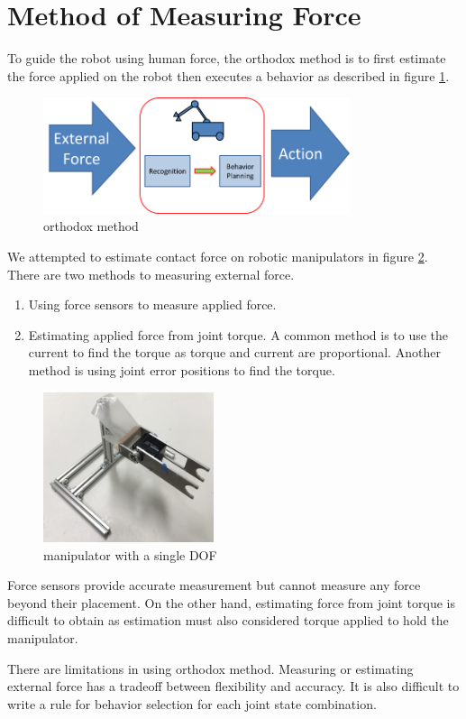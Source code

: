 \section{Method of Measuring Force}
To guide the robot using human force, the orthodox method is to first estimate the force applied on the robot then executes a behavior as described in figure \ref{fig:orthodox}.

\begin{figure}[!h]
\begin{center}
\includegraphics[width=9cm]{orthodox_method.png}
\caption{orthodox method}
\label{fig:orthodox}
\end{center}
\end{figure}

We attempted to estimate contact force on robotic manipulators in figure \ref{fig:manipulator}. There are two methods to measuring external force. 

\begin{enumerate}
\item Using force sensors to measure applied force.
\item Estimating applied force from joint torque. A common method is to use the current to find the torque as torque and current are proportional. Another method is using joint error positions to find the torque.
\end{enumerate}

\begin{figure}[!h]
\begin{center}
\includegraphics[width=5cm]{manipulator.jpg}
\caption{manipulator with a single DOF}
\label{fig:manipulator}
\end{center}
\end{figure}

Force sensors provide accurate measurement but cannot measure any force beyond their placement. On the other hand, estimating force from joint torque is difficult to obtain as estimation must also considered torque applied to hold the manipulator. 

There are limitations in using orthodox method. Measuring or estimating external force has a tradeoff between flexibility and accuracy. It is also difficult to write a rule for behavior selection for each joint state combination.
